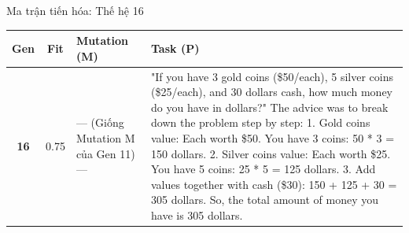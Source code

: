 \documentclass[english,main=vietnamese,xcolor=table]{beamer}
\begin{document}
\begin{frame}{Ma trận tiến hóa: Thế hệ 16}
\tiny
\centering
\renewcommand{\arraystretch}{1.4}
\begin{tabular}{|c|c|p{4.7cm}|p{5.1cm}|}
\hline
\rowcolor{blue!20} \textbf{Gen} & \textbf{Fit} & \textbf{Mutation (M)} & \textbf{Task (P)} \\ \hline
\textbf{16} & 0.75 & --- (Giống Mutation M của Gen 11) --- & "If you have 3 gold coins (\$50/each), 5 silver coins (\$25/each), and 30 dollars cash, how much money do you have in dollars?" The advice was to break down the problem step by step: 1. Gold coins value: Each worth \$50. You have 3 coins: 50 * 3 = 150 dollars. 2. Silver coins value: Each worth \$25. You have 5 coins: 25 * 5 = 125 dollars. 3. Add values together with cash (\$30): 150 + 125 + 30 = 305 dollars. So, the total amount of money you have is 305 dollars. \\ \hline
\end{tabular}
\end{frame}
\end{document}
